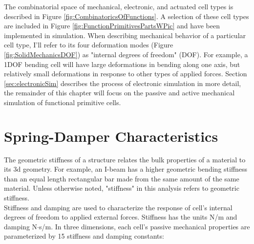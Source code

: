 { The combinatorial space of mechanical, electronic, and actuated cell types is described in Figure \ref{fig:CombinatoricsOfFunctions}.  A selection of these cell types are included in Figure \ref{fig:FunctionPrimitivesPartsWPic} and have been implemented in simulation.  When describing mechanical behavior of a particular cell type, I'll refer to its four deformation modes (Figure \ref{fig:SolidMechanicsDOF}) as "internal degrees of freedom" (DOF).  For example, a 1DOF bending cell will have large deformations in bending along one axis, but relatively small deformations in response to other types of applied forces.  Section \ref{sec:electronicSim} describes the process of electronic simulation in more detail, the remainder of this chapter will focus on the passive and active mechanical simulation of functional primitive cells.

\section{Spring-Damper Characteristics}

The geometric stiffness of a structure relates the bulk properties of a material to its 3d geometry.  For example, an I-beam has a higher geometric bending stiffness than an equal length rectangular bar made from the same amount of the same material.  Unless otherwise noted, "stiffness" in this analysis refers to geometric stiffness.\\

Stiffness and damping are used to characterize the response of cell's internal degrees of freedom to applied external forces.  Stiffness has the units N/m and damping N$\cdot$s/m.  In three dimensions, each cell's passive mechanical properties are parameterized by 15 stiffness and damping constants:

}
